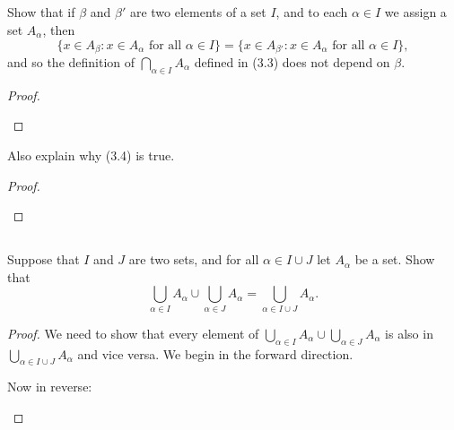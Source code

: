 \documentclass[../../main.tex]{subfiles}
\begin{document}
\addtocounter{subsection}{1}
\subsection{}
\begin{q}
    Show that if $\beta$ and $\beta'$ are two elements of a set $I$, and to each $\alpha \in I$ we assign a set $A_\alpha$, then \[
        \{
            x \in A_\beta : x \in A_\alpha \text{ for all } \alpha \in I
        \} = 
        \{
            x \in A_{\beta'} : x \in A_\alpha \text{ for all } \alpha \in I
        \},
    \]
    and so the definition of $\bigcap_{\alpha \in I} A_\alpha$ defined in (3.3) does not depend on $\beta$. 
\end{q}

\begin{proof}
    
    \begin{xx}
        
    \end{xx}
\end{proof}

\begin{q}
    Also explain why (3.4) is true.
\end{q}

\begin{proof}
    
    \begin{xx}
        
    \end{xx}
\end{proof}

\subsection{}
\begin{q}
    Suppose that $I$ and $J$ are two sets, and for all $\alpha \in I \cup J$ let $A_\alpha$ be a set. Show that
    \[\bigcup_{\alpha \in I} A_\alpha \cup \bigcup_{\alpha \in J} A_\alpha = \bigcup_{\alpha \in I \cup J} A_\alpha.\]
\end{q}

    \begin{proof}
    We need to show that every element of $\bigcup_{\alpha \in I} A_\alpha \cup \bigcup_{\alpha \in J} A_\alpha$ is also in $\bigcup_{\alpha \in I \cup J} A_\alpha$ and vice versa. We begin in the forward direction.
        \begin{xx}
        \begin{lxl}
            \item
        \end{lxl}
    Now in reverse:
        \begin{lxl}
            \item
        \end{lxl}
        \end{xx}
    \end{proof}
\end{document}
